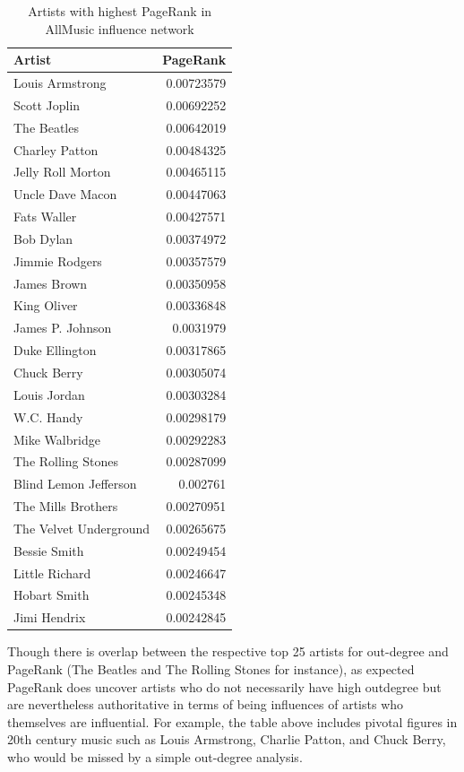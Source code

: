 \begin{table}[H]
\centering
\caption{Artists with highest PageRank in AllMusic influence network}
\begin{tabular}{lr}
\hline
 Artist                 &   PageRank \\
\hline
 Louis Armstrong        & 0.00723579 \\
 Scott Joplin           & 0.00692252 \\
 The Beatles            & 0.00642019 \\
 Charley Patton         & 0.00484325 \\
 Jelly Roll Morton      & 0.00465115 \\
 Uncle Dave Macon       & 0.00447063 \\
 Fats Waller            & 0.00427571 \\
 Bob Dylan              & 0.00374972 \\
 Jimmie Rodgers         & 0.00357579 \\
 James Brown            & 0.00350958 \\
 King Oliver            & 0.00336848 \\
 James P. Johnson       & 0.0031979  \\
 Duke Ellington         & 0.00317865 \\
 Chuck Berry            & 0.00305074 \\
 Louis Jordan           & 0.00303284 \\
 W.C. Handy             & 0.00298179 \\
 Mike Walbridge         & 0.00292283 \\
 The Rolling Stones     & 0.00287099 \\
 Blind Lemon Jefferson  & 0.002761   \\
 The Mills Brothers     & 0.00270951 \\
 The Velvet Underground & 0.00265675 \\
 Bessie Smith           & 0.00249454 \\
 Little Richard         & 0.00246647 \\
 Hobart Smith           & 0.00245348 \\
 Jimi Hendrix           & 0.00242845 \\
\hline
\end{tabular}
\end{table}

Though there is overlap between the respective top 25 artists for out-degree and PageRank (The Beatles and The Rolling Stones for instance), as expected PageRank does uncover artists who do not necessarily have high outdegree but are nevertheless authoritative in terms of being influences of artists who themselves are influential. For example, the table above includes pivotal figures in 20th century music such as Louis Armstrong, Charlie Patton, and Chuck Berry, who would be missed by a simple out-degree analysis.

